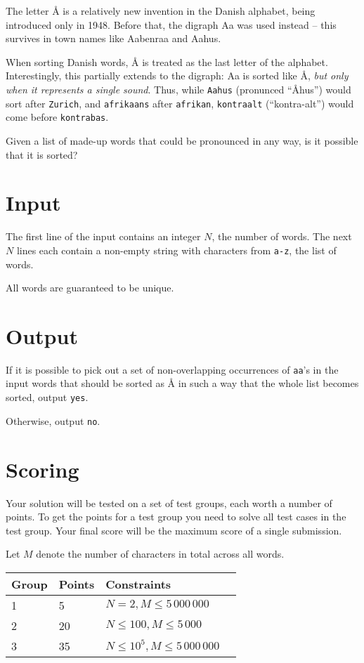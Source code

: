 The letter Å is a relatively new invention in the Danish alphabet, being introduced only in 1948.
Before that, the digraph Aa was used instead -- this survives in town names like Aabenraa and Aahus.

When sorting Danish words, Å is treated as the last letter of the alphabet.
Interestingly, this partially extends to the digraph: Aa is sorted like Å,
\emph{but only when it represents a single sound}.
Thus, while \texttt{Aahus} (pronunced ``Åhus'') would sort after \texttt{Zurich},
and \texttt{afrikaans} after \texttt{afrikan},
\texttt{kontraalt} (``kontra-alt'') would come before \texttt{kontrabas}.

Given a list of made-up words that could be pronounced in any way, is it possible that it is sorted?

\section*{Input}
The first line of the input contains an integer $N$, the number of words.
The next $N$ lines each contain a non-empty string with characters from \texttt{a-z}, the list of words.

All words are guaranteed to be unique.

\section*{Output}
If it is possible to pick out a set of non-overlapping occurrences of \texttt{aa}'s in the input words that
should be sorted as Å in such a way that the whole list becomes sorted, output \texttt{yes}.

Otherwise, output \texttt{no}.

\section*{Scoring}
Your solution will be tested on a set of test groups, each worth a number of points.
To get the points for a test group you need to solve all test cases in the test group.
Your final score will be the maximum score of a single submission.

Let $M$ denote the number of characters in total across all words.

\noindent
\begin{tabular}{| l | l | l | l |}
\hline
Group & Points & Constraints \\ \hline
1     & 5      & $N = 2, M \le 5\,000\,000$ \\ \hline
2     & 20     & $N \le 100, M \le 5\,000$ \\ \hline
3     & 35     & $N \le 10^5, M \le 5\,000\,000$ \\ \hline
\end{tabular}

